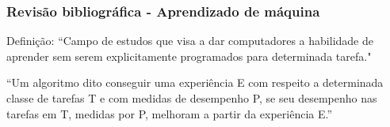 \documentclass{beamer}
\begin{document}
\begin{frame}
\frametitle{Revisão bibliográfica - Aprendizado de máquina}
Definição:
“Campo de estudos que visa a dar computadores a habilidade de aprender sem serem explicitamente programados para determinada tarefa." ~\cite{Samuel1959SomeSI}

“Um algoritmo dito conseguir uma experiência E com respeito a determinada classe de tarefas T e com medidas de desempenho P, se seu desempenho nas tarefas em T, medidas por P, melhoram a partir da experiência E.” ~\cite{Mitchell97} 



\end{frame}
\end{document}

